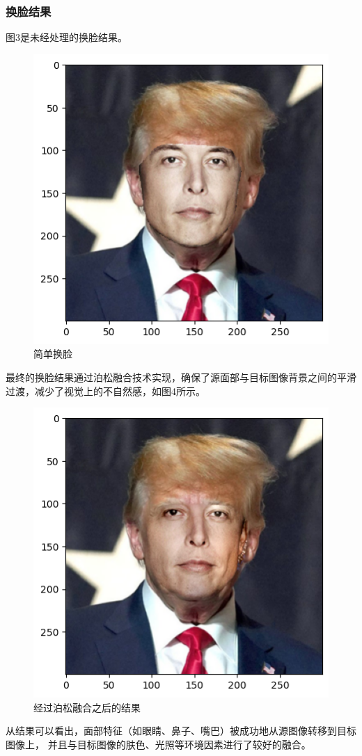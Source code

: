 \subsubsection{换脸结果}
图3是未经处理的换脸结果。
\begin{figure}
	\centering
	\includegraphics[width=0.7\linewidth]{image/traditional_swap}
	\caption{简单换脸}
	\label{图3：}
\end{figure}

最终的换脸结果通过泊松融合技术实现，确保了源面部与目标图像背景之间的平滑过渡，减少了视觉上的不自然感，如图4所示。
\begin{figure}
	\centering
	\includegraphics[width=0.7\linewidth]{image/seamlessClone}
	\caption{经过泊松融合之后的结果}
	\label{图4：}
\end{figure}


从结果可以看出，面部特征（如眼睛、鼻子、嘴巴）被成功地从源图像转移到目标图像上，
并且与目标图像的肤色、光照等环境因素进行了较好的融合。

